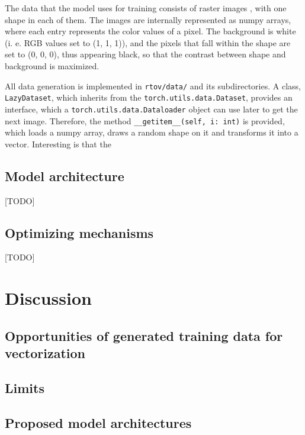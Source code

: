\documentclass[12pt, a4paper, titlepage]{report}
\begin{document}
The data that the model uses for training consists of raster images , with one shape in each of them. The images are internally represented as numpy arrays, where each entry represents the color values of a pixel. The background is white (i. e. RGB values set to (1, 1, 1)), and the pixels that fall within the shape are set to (0, 0, 0), thus appearing black, so that the contrast between shape and background is maximized.

All data generation is implemented in \lstinline{rtov/data/} and its subdirectories. A class, \lstinline{LazyDataset}, which inherits from the \lstinline{torch.utils.data.Dataset}, provides an interface, which a \lstinline{torch.utils.data.Dataloader} object can use later to get the next image. Therefore, the method \lstinline{__getitem__(self, i: int)} is provided, which loads a numpy array, draws a random shape on it and transforms it into a vector. Interesting is that the 

\section{Model architecture}

[TODO]

\section{Optimizing mechanisms}

[TODO]




\chapter{Discussion}

\section{Opportunities of generated training data for vectorization}

\section{Limits}

\section{Proposed model architectures}
\end{document}
